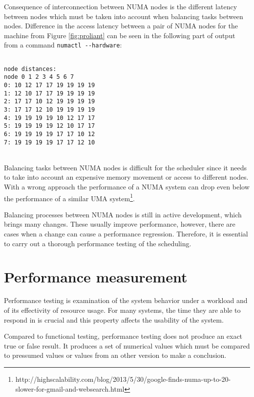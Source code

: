 Consequence of interconnection between NUMA nodes is the different latency
between nodes which must be taken into account when balancing tasks between
nodes. Difference in the access latency between a pair of NUMA nodes for the
machine from Figure \ref{fig:proliant} can be seen in the following part of
output from a command \verb|numactl --hardware|:

\begin{minipage}{\linewidth}
\begin{verbatim}

node distances:
node 0 1 2 3 4 5 6 7
0: 10 12 17 17 19 19 19 19
1: 12 10 17 17 19 19 19 19
2: 17 17 10 12 19 19 19 19
3: 17 17 12 10 19 19 19 19
4: 19 19 19 19 10 12 17 17
5: 19 19 19 19 12 10 17 17
6: 19 19 19 19 17 17 10 12
7: 19 19 19 19 17 17 12 10
\end{verbatim}
\end{minipage}\\

Balancing tasks between NUMA nodes is difficult for the scheduler since it needs
to take into account an expensive memory movement or access to different nodes.
With a wrong approach the performance of a NUMA system can drop even below the
performance of a similar UMA
system\footnote{http://highscalability.com/blog/2013/5/30/google-finds-numa-up-to-20-slower-for-gmail-and-websearch.html}.

Balancing processes between NUMA nodes is still in active development, which
brings many changes. These usually improve performance, however, there are cases
when a change can cause a performance regression. Therefore, it is essential to
carry out a thorough performance testing of the scheduling.




\chapter{Performance measurement} \label{ch:measurement}
Performance testing is examination of the system behavior under a workload and of its
effectivity of resource usage. For many systems, the time they are able to
respond in is crucial and this property affects the usability of the system.

Compared to functional testing, performance testing does not produce an exact true
or false result. It produces a set of numerical values which must be compared to
pressumed values or values from an other version to make a conclusion.

